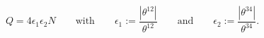 \begin{equation}
 Q=4\epsilon_1\epsilon_2N\qquad\text{with}\qquad 
 \epsilon_1:=\frac{|\theta^{12}|}{\theta^{12}}
 \qquad\text{and}\qquad \epsilon_2
 :=\frac{|\theta^{34}|}{\theta^{34}}. 
\end{equation}

